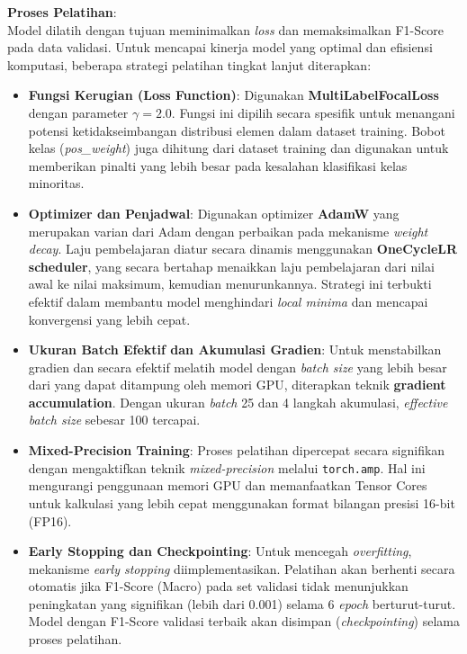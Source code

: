 \begin{enumerate}
    \textbf{Proses Pelatihan}:\\
    Model dilatih dengan tujuan meminimalkan \textit{loss} dan memaksimalkan F1-Score pada data validasi. Untuk mencapai kinerja model yang optimal dan efisiensi komputasi, beberapa strategi pelatihan tingkat lanjut diterapkan:
    \begin{itemize}
        \item \textbf{Fungsi Kerugian (Loss Function)}: Digunakan \textbf{MultiLabelFocalLoss} dengan parameter $\gamma=2.0$. Fungsi ini dipilih secara spesifik untuk menangani potensi ketidakseimbangan distribusi elemen dalam dataset training. Bobot kelas (\textit{pos\_weight}) juga dihitung dari dataset training dan digunakan untuk memberikan pinalti yang lebih besar pada kesalahan klasifikasi kelas minoritas.
        \item \textbf{Optimizer dan Penjadwal}: Digunakan optimizer \textbf{AdamW} yang merupakan varian dari Adam dengan perbaikan pada mekanisme \textit{weight decay}. Laju pembelajaran diatur secara dinamis menggunakan \textbf{OneCycleLR scheduler}, yang secara bertahap menaikkan laju pembelajaran dari nilai awal ke nilai maksimum, kemudian menurunkannya. Strategi ini terbukti efektif dalam membantu model menghindari \textit{local minima} dan mencapai konvergensi yang lebih cepat.
        \item \textbf{Ukuran Batch Efektif dan Akumulasi Gradien}: Untuk menstabilkan gradien dan secara efektif melatih model dengan \textit{batch size} yang lebih besar dari yang dapat ditampung oleh memori GPU, diterapkan teknik \textbf{gradient accumulation}. Dengan ukuran \textit{batch} 25 dan 4 langkah akumulasi, \textit{effective batch size} sebesar 100 tercapai.
        \item \textbf{Mixed-Precision Training}: Proses pelatihan dipercepat secara signifikan dengan mengaktifkan teknik \textit{mixed-precision} melalui \texttt{torch.amp}. Hal ini mengurangi penggunaan memori GPU dan memanfaatkan Tensor Cores untuk kalkulasi yang lebih cepat menggunakan format bilangan presisi 16-bit (FP16).
        \item \textbf{Early Stopping dan Checkpointing}: Untuk mencegah \textit{overfitting}, mekanisme \textit{early stopping} diimplementasikan. Pelatihan akan berhenti secara otomatis jika F1-Score (Macro) pada set validasi tidak menunjukkan peningkatan yang signifikan (lebih dari 0.001) selama 6 \textit{epoch} berturut-turut. Model dengan F1-Score validasi terbaik akan disimpan (\textit{checkpointing}) selama proses pelatihan.
    \end{itemize}


\end{enumerate}
